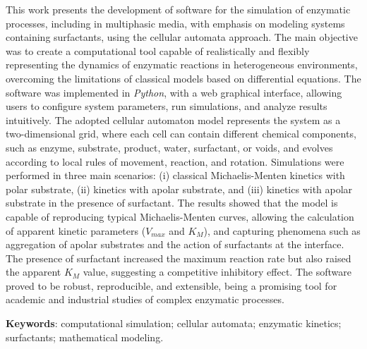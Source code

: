 \documentclass[12pt,oneside]{report}
\begin{document}
\medskip

This work presents the development of software for the simulation of enzymatic processes, including in multiphasic media, with emphasis on modeling systems containing surfactants, using the cellular automata approach. The main objective was to create a computational tool capable of realistically and flexibly representing the dynamics of enzymatic reactions in heterogeneous environments, overcoming the limitations of classical models based on differential equations. The software was implemented in \textit{Python}, with a web graphical interface, allowing users to configure system parameters, run simulations, and analyze results intuitively. The adopted cellular automaton model represents the system as a two-dimensional grid, where each cell can contain different chemical components, such as enzyme, substrate, product, water, surfactant, or voids, and evolves according to local rules of movement, reaction, and rotation. Simulations were performed in three main scenarios: (i) classical Michaelis-Menten kinetics with polar substrate, (ii) kinetics with apolar substrate, and (iii) kinetics with apolar substrate in the presence of surfactant. The results showed that the model is capable of reproducing typical Michaelis-Menten curves, allowing the calculation of apparent kinetic parameters ($V_{max}$ and $K_M$), and capturing phenomena such as aggregation of apolar substrates and the action of surfactants at the interface. The presence of surfactant increased the maximum reaction rate but also raised the apparent $K_M$ value, suggesting a competitive inhibitory effect. The software proved to be robust, reproducible, and extensible, being a promising tool for academic and industrial studies of complex enzymatic processes.

\medskip

\textbf{Keywords}: computational simulation; cellular automata; enzymatic kinetics; surfactants; mathematical modeling.

\newpage

\listoffigures
\newpage

\listoftables
\newpage

\end{document}
